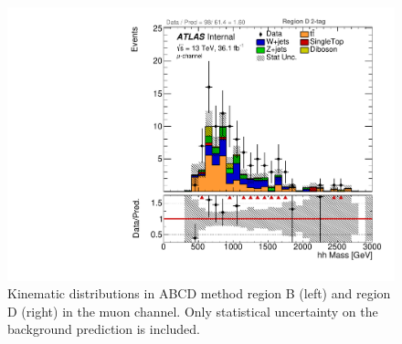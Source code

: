\begin{figure}[!htbp]
\begin{center}
\includegraphics[scale=0.33]{./figures/boosted/ABCD_ScaledPrompt/muon_Inc_RegionD_hhMass}     
\caption{Kinematic distributions in ABCD method region B (left) and region D (right) in the muon channel.
Only statistical uncertainty on the background prediction is included.}
\label{fig:boosted_abcd_scaledprompt_region_bd_muon}
\end{center}
\end{figure}



